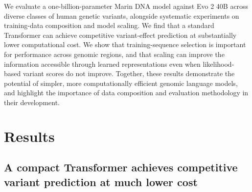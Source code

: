 \documentclass[a4paper,num-refs]{oup-contemporary}
\begin{document}
We evaluate a one-billion-parameter Marin DNA model against Evo 2 40B across
diverse classes of human genetic variants, alongside systematic experiments
on training-data composition and model scaling. We find that a standard
Transformer can achieve competitive variant-effect prediction at substantially
lower computational cost. We show that training-sequence selection is
important for performance across genomic regions, and that scaling can
improve the information accessible through learned representations even when
likelihood-based variant scores do not improve. Together, these results
demonstrate the potential of simpler, more computationally efficient genomic
language models, and highlight the importance of data composition and
evaluation methodology in their development.

\section{Results}
\subsection{A compact Transformer achieves competitive variant prediction at
much lower cost}
\end{document}
